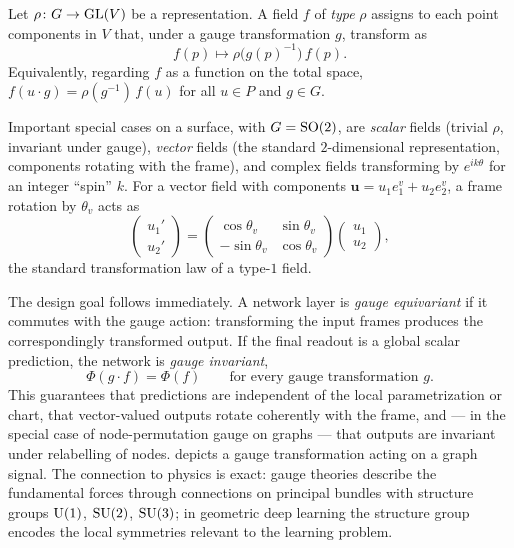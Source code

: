 \begin{definition}
\label{def:gauge:field}
Let $\rho\colon G \to \operatorname{GL}(V)$ be a representation. A field $f$ of \emph{type}
$\rho$ assigns to each point components in $V$ that, under a gauge transformation
$g$, transform as
\[
  f(p) \longmapsto \rho\big(g(p)^{-1}\big)\, f(p).
\]
Equivalently, regarding $f$ as a function on the total space, $f(u \cdot g) =
\rho(g^{-1})\, f(u)$ for all $u \in P$ and $g \in G$.
\end{definition}

Important special cases on a surface, with $G = \operatorname{SO}(2)$, are \emph{scalar}
fields (trivial $\rho$, invariant under gauge), \emph{vector} fields (the
standard $2$-dimensional representation, components rotating with the frame),
and complex fields transforming by $e^{i k\theta}$ for an integer ``spin'' $k$.
For a vector field with components $\mathbf{u} = u_1 e_1^v + u_2 e_2^v$, a frame
rotation by $\theta_v$ acts as
\[
  \begin{pmatrix} u_1' \\ u_2' \end{pmatrix} =
  \begin{pmatrix} \cos\theta_v & \sin\theta_v \\ -\sin\theta_v & \cos\theta_v
  \end{pmatrix}
  \begin{pmatrix} u_1 \\ u_2 \end{pmatrix},
\]
the standard transformation law of a type-$1$ field.

The design goal follows immediately. A network layer is \emph{gauge equivariant}
if it commutes with the gauge action: transforming the input frames produces the
correspondingly transformed output. If the final readout is a global scalar
prediction, the network is \emph{gauge invariant},
\[
  \Phi(g \cdot f) = \Phi(f) \qquad \text{for every gauge transformation } g.
\]
This guarantees that predictions are independent of the local parametrization or
chart, that vector-valued outputs rotate coherently with the frame, and --- in
the special case of node-permutation gauge on graphs --- that outputs are
invariant under relabelling of nodes.  depicts a
gauge transformation acting on a graph signal. The connection to physics is
exact: gauge theories describe the fundamental forces through connections on
principal bundles with structure groups $\operatorname{U}(1)$, $\operatorname{SU}(2)$, $\operatorname{SU}(3)$; in
geometric deep learning the structure group encodes the local symmetries relevant
to the learning problem.


